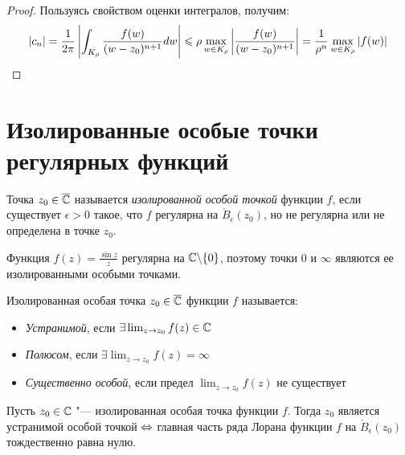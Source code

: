 \begin{proof}
	Пользуясь свойством оценки интегралов, получим:
	\[|c_n| = \frac1{2\pi}\left|\int_{K_{\rho}} \frac{f(w)}{(w - z_0)^{n+1}}dw\right| \le \rho\max_{w \in K_\rho}\left|\frac{f(w)}{(w - z_0)^{n+1}}\right| = \frac1{\rho^n}\max_{w \in K_{\rho}}\left|{f(w)}\right| \qedhere\]
\end{proof}

\section{Изолированные особые точки регулярных функций}

\begin{definition}
	Точка $z_0 \in \CM$ называется \textit{изолированной особой точкой} функции $f$, если существует $\epsilon > 0$ такое, что $f$ регулярна на $\mathring B_\epsilon(z_0)$, но не регулярна или не определена в точке $z_0$.
\end{definition}

\begin{example}
	Функция $f(z) = \frac{\sin{z}}{z}$ регулярна на $\Cm \bs \{0\}$, поэтому точки $0$ и $\infty$ являются ее изолированными особыми точками.
\end{example}

\begin{definition}
	Изолированная особая точка $z_0 \in \CM$ функции $f$ называется:
	\begin{itemize}
		\item \textit{Устранимой}, если $\exists \lim_{z \to z_0} f(z) \in \Cm$
		\item \textit{Полюсом}, если $\exists \lim_{z \to z_0} f(z) = \infty$
		\item \textit{Существенно особой}, если предел $\lim_{z \to z_0} f(z)$ не существует
	\end{itemize}
\end{definition}

\begin{proposition}
	Пусть $z_0 \in \Cm$ "--- изолированная особая точка функции $f$. Тогда $z_0$ является устранимой особой точкой $\lra$ главная часть ряда Лорана функции $f$ на $\mathring B_\epsilon(z_0)$ тождественно равна нулю.
\end{proposition}

